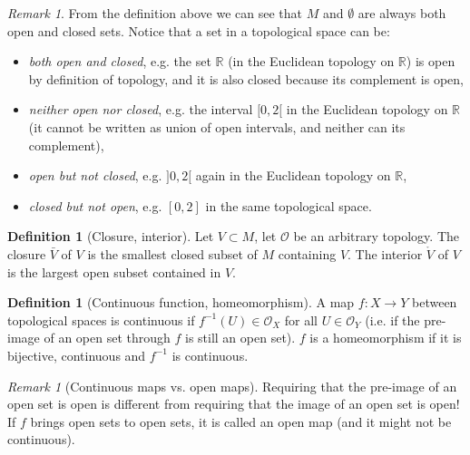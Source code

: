 \documentclass[a4paper,11pt,titlepage, article, oneside]{memoir}
\numberwithin{equation}{section}
\theoremstyle{definition}
\newtheorem{definition}[theorem]{Definition}
\theoremstyle{remark}
\newtheorem{remark}[theorem]{Remark}
\newcommand{\rfield}{\mathbb{R}}
\begin{document}
\begin{remarkbox}\begin{remark}
From the definition above we can see that $M$ and $\emptyset$ are always both open and closed sets. Notice that a set in a topological space can be: \begin{itemize}
\item \textit{both open and closed}, e.g. the set $\rfield$ (in the Euclidean topology on $\rfield$) is open by definition of topology, and it is also closed because its complement is open,
\item \textit{neither open nor closed}, e.g. the interval $[0, 2[$ in the Euclidean topology on $\rfield$ (it cannot be written as union of open intervals, and neither can its complement),
\item \textit{open but not closed}, e.g. $]0, 2[$ again in the Euclidean topology on $\rfield$,
\item \textit{closed but not open}, e.g. $[0, 2]$ in the same topological space.
\end{itemize}
\end{remark}\end{remarkbox}

\begin{definition}[Closure, interior]
Let $V \subset M$, let $\mathcal{O}$ be an arbitrary topology. The closure $\bar V $ of $V$ is the smallest closed subset of $M$ containing $V$. The interior $\mathring V$ of $V$ is the largest open subset contained in $V$.
\end{definition} %

\begin{definition}[Continuous function, homeomorphism] \label{topcontinuity}
A map $f \colon X \rightarrow Y$ between topological spaces is continuous if $f^{-1}(U) \in \mathcal{O}_X$ for all $U \in \mathcal{O}_Y$ (i.e. if the pre-image of an open set through $f$ is still an open set). $f$ is a homeomorphism if it is bijective, continuous and $f^{-1}$ is continuous.
\end{definition}

\begin{remarkbox}\begin{remark}[Continuous maps vs. open maps]
Requiring that the pre-image of an open set is open is different from requiring that the image of an open set is open! If $f$ brings open sets to open sets, it is called an open map (and it might not be continuous).
\end{remark}\end{remarkbox}
\end{document}
